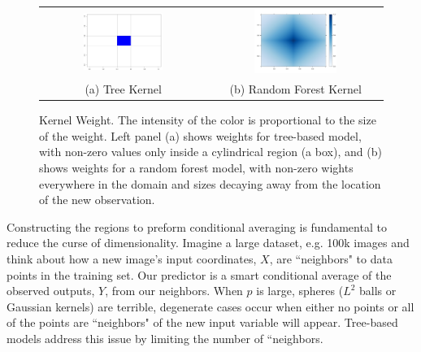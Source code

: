 \documentclass[12pt]{article}
\begin{document}
\begin{figure}[H]
	\centering
\begin{tabular}{cc}
	\includegraphics[width=0.5\textwidth]{cylinder_kernel}& 	\includegraphics[width=0.5\textwidth]{rf_kernel}\\
	(a) Tree Kernel & (b) Random Forest Kernel
\end{tabular}
\caption{Kernel Weight. The intensity of the color is proportional to the size of the weight. Left panel (a) shows weights for tree-based model, with non-zero values only inside a cylindrical region (a box), and (b)  shows weights for a random forest model, with non-zero wights everywhere in the domain and sizes decaying away from the location of the new observation.}
\label{fig:cilinder}
\end{figure}

Constructing the regions to preform conditional averaging is fundamental to reduce the curse of dimensionality. Imagine a large dataset, e.g. 100k images and think about how a new image's input coordinates, $X$, are ``neighbors" to data points in the training set.  Our predictor is a smart conditional average of the observed outputs, $Y$, from our neighbors. When $p$ is large,  spheres ($L^2$ balls or Gaussian kernels) are terrible, degenerate cases occur when  either no points or all of the points are ``neighbors" of the new input variable will appear. Tree-based models address this issue by limiting the number of ``neighbors. 
\end{document}
